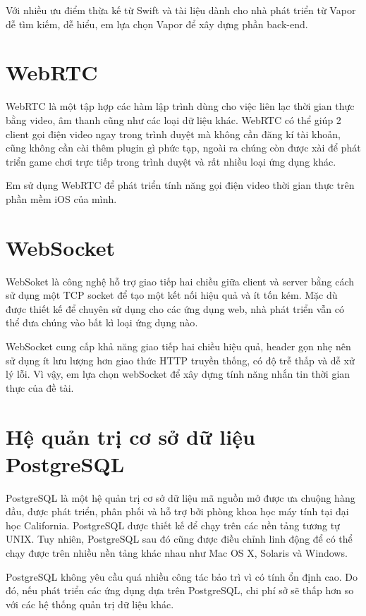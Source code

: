 \documentclass[../DoAn.tex]{subfiles}
\begin{document}
Với nhiều ưu điểm thừa kế từ Swift và tài liệu dành cho nhà phát triển từ Vapor dễ tìm kiếm, dễ hiểu, em lựa chọn Vapor để xây dựng phần back-end.


\section{WebRTC}
WebRTC là một tập hợp các hàm lập trình dùng cho việc liên lạc thời gian thực bằng video, âm thanh cũng như các loại dữ liệu khác. WebRTC có thể giúp 2 client gọi điện video ngay trong trình duyệt mà không cần đăng kí tài khoản, cũng không cần cài thêm plugin gì phức tạp, ngoài ra chúng còn được xài để phát triển game chơi trực tiếp trong trình duyệt và rất nhiều loại ứng dụng khác\cite{WebRTC}.

Em sử dụng WebRTC để phát triển tính năng gọi điện video thời gian thực trên phần mềm iOS của mình.


\section{WebSocket}
WebSoket là công nghệ hỗ trợ giao tiếp hai chiều giữa client và server bằng cách sử dụng một TCP socket để tạo một kết nối hiệu quả và ít tốn kém. Mặc dù được thiết kế để chuyên sử dụng cho các ứng dụng web, nhà phát triển vẫn có thể đưa chúng vào bất kì loại ứng dụng nào\cite{WebSocket}.

WebSocket cung cấp khả năng giao tiếp hai chiều hiệu quả, header gọn nhẹ nên sử dụng ít lưu lượng hơn giao thức HTTP truyền thống, có độ trễ thấp và dễ xử lý lỗi. Vì vậy, em lựa chọn webSocket để xây dựng tính năng nhắn tin thời gian thực của đề tài.


\section{Hệ quản trị cơ sở dữ liệu PostgreSQL}
PostgreSQL là một hệ quản trị cơ sở dữ liệu mã nguồn mở được ưa chuộng hàng đầu, được phát triển, phân phối và hỗ trợ bởi phòng khoa học máy tính tại đại học California. PostgreSQL được thiết kế để chạy trên các nền tảng tương tự UNIX. Tuy nhiên, PostgreSQL sau đó cũng được điều chỉnh linh động để có thể chạy được trên nhiều nền tảng khác nhau như Mac OS X, Solaris và Windows\cite{PostgreSQL}.

PostgreSQL không yêu cầu quá nhiều công tác bảo trì vì có tính ổn định cao. Do đó, nếu phát triển các ứng dụng dựa trên PostgreSQL, chi phí sở sẽ thấp hơn so với các hệ thống quản trị dữ liệu khác.
\end{document}
